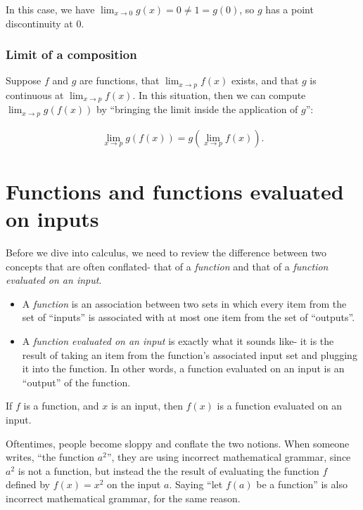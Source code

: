 In this case, we have $\lim_{x \rightarrow 0} g(x) = 0 \neq 1 = g(0)$, so $g$ has a point discontinuity at $0$.

\subsubsection*{Limit of a composition}

Suppose $f$ and $g$ are functions, that $\lim_{x \rightarrow p} f(x)$ exists, and that $g$ is continuous at $\lim_{x \rightarrow p} f(x)$. In this situation, then we can compute $\lim_{x \rightarrow p} g(f(x))$ by ``bringing the limit inside the application of $g$'': 

\begin{align*}
    {\lim_{x \rightarrow p} g(f(x)) = g(\lim_{x \rightarrow p}f(x))}.
\end{align*}

\newpage

\section*{Functions and functions evaluated on inputs}

Before we dive into calculus, we need to review the difference between two concepts that are often conflated- that of a \textit{function} and that of a \textit{function evaluated on an input}. 

\begin{itemize}
    \item A \textit{function} is an association between two sets in which every item from the set of ``inputs'' is associated with at most one item from the set of ``outputs''.
    \item A \textit{function evaluated on an input} is exactly what it sounds like- it is the result of taking an item from the function's associated input set and plugging it into the function. In other words, a function evaluated on an input is an ``output'' of the function.
\end{itemize}

If $f$ is a function, and $x$ is an input, then $f(x)$ is a function evaluated on an input.

Oftentimes, people become sloppy and conflate the two notions. When someone writes, ``the function $a^2$'', they are using incorrect mathematical grammar, since $a^2$ is not a function, but instead the the result of evaluating the function $f$ defined by $f(x) = x^2$ on the input $a$. Saying ``let $f(a)$ be a function'' is also incorrect mathematical grammar, for the same reason.

